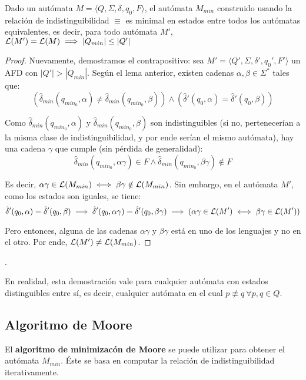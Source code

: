 \begin{theorem*}
    Dado un autómata $M = \langle Q, \Sigma, \delta, q_0, F \rangle$, el autómata $M_{min}$ construido usando la relación de indistinguibilidad $\equiv$ es minimal en estados entre todos los autómatas equivalentes, es decir, para todo autómata $M'$, $\mathcal{L}(M') = \mathcal{L}(M) \implies |Q_{min}| \leq |Q'|$
\end{theorem*}
\begin{proof}
    Nuevamente, demostramos el contrapositivo: sea $M'= \langle Q', \Sigma, \delta', q_0', F' \rangle$ un AFD con $|Q'| > |Q_{min}|$. Según el lema anterior, existen cadenas $\alpha, \beta \in \Sigma^*$ tales que:
    $$
        (\hat\delta_{min}(q_{min_0}, \alpha) \neq \hat\delta_{min}(q_{min_0}, \beta)) \land (\hat\delta'(q_0, \alpha) = \hat\delta'(q_0, \beta))
    $$

    Como $\hat\delta_{min}(q_{min_0}, \alpha)$ y $\hat\delta_{min}(q_{min_0}, \beta)$ son indistinguibles (si no, pertenecerían a la misma clase de indistinguibilidad, y por ende serían el mismo autómata), hay una cadena $\gamma$ que cumple (sin pérdida de generalidad):
    $$
        \hat\delta_{min}(q_{min_0}, \alpha\gamma) \in F \land \hat\delta_{min}(q_{min_0}, \beta\gamma) \notin F
    $$

    Es decir, $\alpha\gamma \in \mathcal{L}(M_{min}) \iff \beta\gamma \notin \mathcal{L}(M_{min})$. Sin embargo, en el autómata $M'$, como los estados son iguales, se tiene:
    $$
        \hat\delta'(q_0, \alpha) = \hat\delta'(q_0, \beta) \implies \hat\delta'(q_0, \alpha\gamma) = \hat\delta'(q_0, \beta\gamma) \implies (\alpha\gamma \in \mathcal{L}(M') \iff \beta\gamma \in \mathcal{L}(M'))
    $$

    Pero entonces, alguna de las cadenas $\alpha\gamma$ y $\beta\gamma$ está en uno de los lenguajes y no en el otro. Por ende, $\mathcal{L}(M') \neq \mathcal{L}(M_{min})$.
\end{proof}.

En realidad, esta demostración vale para cualquier autómata con estados distinguibles entre sí, es decir, cualquier autómata en el cual $p \not\equiv q \ \forall p, q \in Q$.

\subsection{Algoritmo de Moore}

El \textbf{algoritmo de minimizacón de Moore} se puede utilizar para obtener el autómata $M_{min}$. Éste se basa en computar la relación de indistinguibilidad iterativamente.

